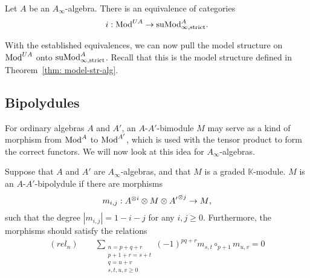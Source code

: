\documentclass[../thesis.tex]{subfiles}
\begin{document}
            \begin{proposition}
                Let $A$ be an $A_\infty$-algebra. There is an equivalence of categories
                \begin{align*}
                    i : \tt{Mod}^{UA} \rightarrow \tt{suMod}_{\infty,\tt{strict}}^A\tt{.}
                \end{align*}
            \end{proposition}

            With the established equivalences, we can now pull the model structure on $\tt{Mod}^{UA}$ onto $\tt{suMod}_{\infty,\tt{strict}}^A$. Recall that this is the model structure defined in Theorem~\ref{thm: model-str-alg}.

        \subsection{Bipolydules}

            For ordinary algebras $A$ and $A'$, an $A$-$A'$-bimodule $M$ may serve as a kind of morphism from $\tt{Mod}^A$ to $\tt{Mod}^{A'}$, which is used with the tensor product to form the correct functors. We will now look at this idea for $A_\infty$-algebras.

            \begin{definition}[$A$-$A'$-Bipolydule]
                Suppose that $A$ and $A'$ are $A_\infty$-algebras, and that $M$ is a graded $\mathbb{K}$-module. $M$ is an $A$-$A'$-bipolydule if there are morphisms
                \begin{align*}
                    m_{i,j} : A^{\otimes i} \otimes M \otimes {A'}^{\otimes j} \rightarrow M\tt{,}
                \end{align*}
                such that the degree $|m_{i,j}| = 1 - i - j$ for any $i,j \geq 0$. Furthermore, the morphisms should satisfy the relations
                \begin{align*}
                    (rel_n)\qquad \sum_{\substack{n = p + q + r \\ p + 1 + r = s + t \\ q = u + v \\ s,t,u,v \geq 0}}(-1)^{pq + r}m_{s,t}\circ_{p+1}m_{u,v} = 0
                \end{align*}
            \end{definition}
\end{document}

